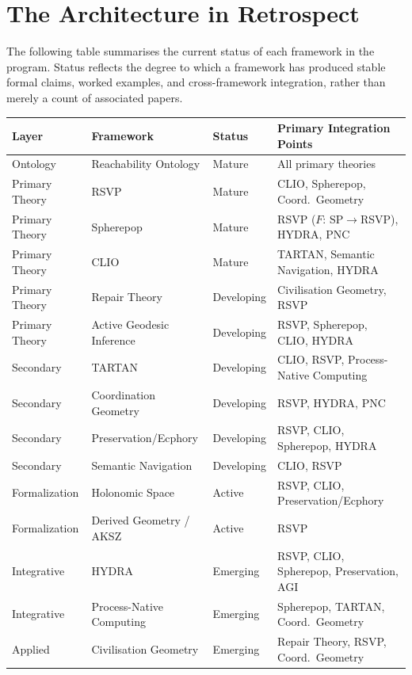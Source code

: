 \documentclass[12pt, twoside]{article}
\begin{document}
\section{The Architecture in Retrospect}

The following table summarises the current status of each framework in the
program. Status reflects the degree to which a framework has produced stable
formal claims, worked examples, and cross-framework integration, rather than
merely a count of associated papers.

\bigskip

\begin{center}
\small
\begin{tabular}{llll}
\toprule
\textbf{Layer} & \textbf{Framework} & \textbf{Status} & \textbf{Primary Integration Points} \\
\midrule
Ontology & Reachability Ontology & Mature & All primary theories \\
Primary Theory & RSVP & Mature & CLIO, Spherepop, Coord.\ Geometry \\
Primary Theory & Spherepop & Mature & RSVP ($F$: SP$\to$RSVP), HYDRA, PNC \\
Primary Theory & CLIO & Mature & TARTAN, Semantic Navigation, HYDRA \\
Primary Theory & Repair Theory & Developing & Civilisation Geometry, RSVP \\
Primary Theory & Active Geodesic Inference & Developing & RSVP, Spherepop, CLIO, HYDRA \\
Secondary & TARTAN & Developing & CLIO, RSVP, Process-Native Computing \\
Secondary & Coordination Geometry & Developing & RSVP, HYDRA, PNC \\
Secondary & Preservation/Ecphory & Developing & RSVP, CLIO, Spherepop, HYDRA \\
Secondary & Semantic Navigation & Developing & CLIO, RSVP \\
Formalization & Holonomic Space & Active & RSVP, CLIO, Preservation/Ecphory \\
Formalization & Derived Geometry / AKSZ & Active & RSVP \\
Integrative & HYDRA & Emerging & RSVP, CLIO, Spherepop, Preservation, AGI \\
Integrative & Process-Native Computing & Emerging & Spherepop, TARTAN, Coord.\ Geometry \\
Applied & Civilisation Geometry & Emerging & Repair Theory, RSVP, Coord.\ Geometry \\
\bottomrule
\end{tabular}
\end{center}
\end{document}

